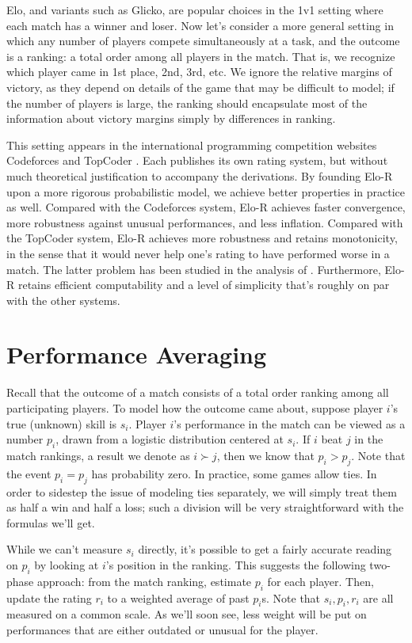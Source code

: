 \documentclass{article}
\begin{document}
Elo, and variants such as Glicko, are popular choices in the 1v1 setting where each match has a winner and loser. Now let's consider a more general setting in which any number of players compete simultaneously at a task, and the outcome is a ranking: a total order among all players in the match. That is, we recognize which player came in 1st place, 2nd, 3rd, etc. We ignore the relative margins of victory, as they depend on details of the game that may be difficult to model; if the number of players is large, the ranking should encapsulate most of the information about victory margins simply by differences in ranking.

This setting appears in the international programming competition websites Codeforces \cite{Codeforces} and TopCoder \cite{TopCoder}. Each publishes its own rating system, but without much theoretical justification to accompany the derivations. By founding Elo-R upon a more rigorous probabilistic model, we achieve better properties in practice as well. Compared with the Codeforces system, Elo-R achieves faster convergence, more robustness against unusual performances, and less inflation. Compared with the TopCoder system, Elo-R achieves more robustness and retains monotonicity, in the sense that it would never help one's rating to have performed worse in a match. The latter problem has been studied in the analysis of \cite{forivsektheoretical}. Furthermore, Elo-R retains efficient computability and a level of simplicity that's roughly on par with the other systems.

\section{Performance Averaging}

Recall that the outcome of a match consists of a total order ranking among all participating players. To model how the outcome came about, suppose player $i$'s true (unknown) skill is $s_i$. Player $i$'s performance in the match can be viewed as a number $p_i$, drawn from a logistic distribution centered at $s_i$. If $i$ beat $j$ in the match rankings, a result we denote as $i \succ j$, then we know that $p_i > p_j$. Note that the event $p_i = p_j$ has probability zero. In practice, some games allow ties. In order to sidestep the issue of modeling ties separately, we will simply treat them as half a win and half a loss; such a division will be very straightforward with the formulas we'll get.

While we can't measure $s_i$ directly, it's possible to get a fairly accurate reading on $p_i$ by looking at $i$'s position in the ranking. This suggests the following two-phase approach: from the match ranking, estimate $p_i$ for each player. Then, update the rating $r_i$ to a weighted average of past $p_i$s. Note that $s_i,p_i,r_i$ are all measured on a common scale. As we'll soon see, less weight will be put on performances that are either outdated or unusual for the player.
\end{document}
